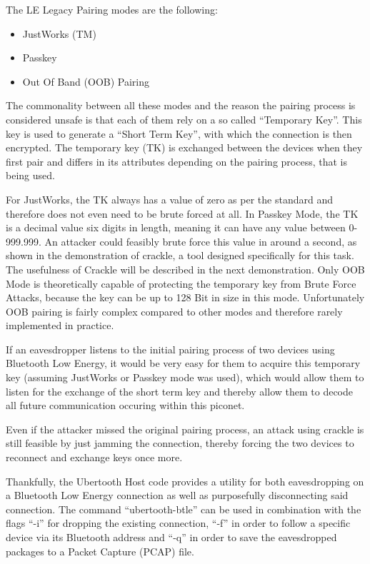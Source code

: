 \begin{itemize}
The LE Legacy Pairing modes are the following:
\begin{itemize}
    \item JustWorks (TM)
    \item Passkey
    \item Out Of Band (OOB) Pairing
\end{itemize}

The commonality between all these modes and the reason the pairing process is considered unsafe is that each of them rely on a so called ``Temporary Key''. This key is used to generate a ``Short Term Key'', with which the connection is then encrypted. The temporary key (TK) is exchanged between the devices when they first pair and differs in its attributes depending on the pairing process, that is being used.

For JustWorks, the TK always has a value of zero as per the standard and therefore does not even need to be brute forced at all. In Passkey Mode, the TK is a decimal value six digits in length, meaning it can have any value between 0-999.999. An attacker could feasibly brute force this value in around a second, as shown in the demonstration of crackle, a tool designed specifically for this task. The usefulness of Crackle will be described in the next demonstration. Only OOB Mode is theoretically capable of protecting the temporary key from Brute Force Attacks, because the key can be up to 128 Bit in size in this mode. Unfortunately OOB pairing is fairly complex compared to other modes and therefore rarely implemented in practice.

If an eavesdropper listens to the initial pairing process of two devices using Bluetooth Low Energy, it would be very easy for them to acquire this temporary key (assuming JustWorks or Passkey mode was used), which would allow them to listen for the exchange of the short term key and thereby allow them to decode all future communication occuring within this piconet. 

Even if the attacker missed the original pairing process, an attack using crackle is still feasible by just jamming the connection, thereby forcing the two devices to reconnect and exchange keys once more.

Thankfully, the Ubertooth Host code provides a utility for both eavesdropping on a Bluetooth Low Energy connection as well as purposefully disconnecting said connection. The command ``ubertooth-btle''  can be used in combination with the flags ``-i'' for dropping the existing connection, ``-f'' in order to follow a specific device via its Bluetooth address and ``-q'' in order to save the eavesdropped packages to a Packet Capture (PCAP) file.\cite{ble4sec}


\end{itemize}
